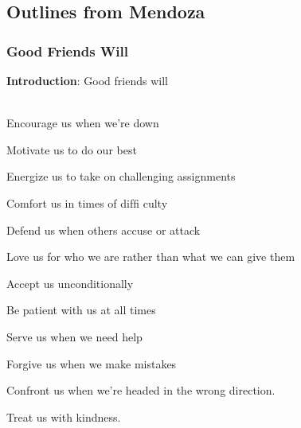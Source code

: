 \subsection{Outlines from Mendoza}


\subsubsection{Good Friends Will}
\textbf{Introduction}: Good friends will\\
\\
\begin{compactenum}[I.][4]
	\item Encourage us when we’re down
	\item Motivate us to do our best
	\item  Energize us to take on challenging assignments
	\item Comfort us in times of difﬁ culty
	\item  Defend us when others accuse or attack
	\item Love us for who we are rather than what we can give them
	\item Accept us unconditionally
	\item Be patient with us at all times
	\item Serve us when we need help
	\item Forgive us when we make mistakes
	\item Confront us when we’re headed in the wrong direction.
	\item Treat us with kindness.
\end{compactenum}



